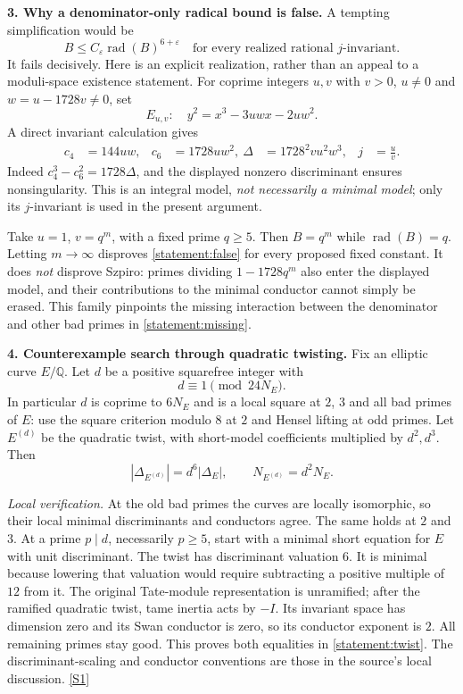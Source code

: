 \documentclass[11pt,a4paper]{article}
\newcommand{\Q}{\mathbb{Q}}
\newcommand{\sref}[2]{\hyperlink{source:#1:#2}{[S#2]}}
\numberwithin{equation}{section}
\begin{document}
\medskip
\textbf{3. Why a denominator-only radical bound is false.}
A tempting simplification would be
\begin{equation}\label{statement:false}
 B\leq C_\varepsilon\operatorname{rad}(B)^{6+\varepsilon}
 \quad\text{for every realized rational $j$-invariant.}
\end{equation}
It fails decisively. Here is an explicit realization, rather than an appeal
to a moduli-space existence statement. For coprime integers $u,v$ with
$v>0$, $u\neq0$ and $w=u-1728v\neq0$, set
\[
 E_{u,v}:\quad y^2=x^3-3uwx-2uw^2.
\]
A direct invariant calculation gives
\begin{align}
 c_4&=144uw, &c_6&=1728uw^2,\
 \Delta&=1728^2vu^2w^3, &j&=\frac uv. \label{statement:jmodel}
\end{align}
Indeed $c_4^3-c_6^2=1728\Delta$, and the displayed nonzero discriminant
ensures nonsingularity. This is an integral model, \emph{not necessarily a
minimal model}; only its $j$-invariant is used in the present argument.

Take $u=1$, $v=q^m$, with a fixed prime $q\geq5$. Then
$B=q^m$ while $\operatorname{rad}(B)=q$. Letting $m\to\infty$ disproves
\eqref{statement:false} for every proposed fixed constant. It does \emph{not}
disprove Szpiro: primes dividing $1-1728q^m$ also enter the displayed model,
and their contributions to the minimal conductor cannot simply be erased.
This family pinpoints the missing interaction between the denominator and
other bad primes in \eqref{statement:missing}.

\medskip
\textbf{4. Counterexample search through quadratic twisting.}
Fix an elliptic curve $E/\Q$. Let $d$ be a positive squarefree integer with
\[
 d\equiv1\pmod{24N_E}.
\]
In particular $d$ is coprime to $6N_E$ and is a local square at $2$, $3$ and
all bad primes of $E$: use the square criterion modulo $8$ at $2$ and Hensel
lifting at odd primes. Let $E^{(d)}$ be the quadratic twist, with short-model
coefficients multiplied by $d^2,d^3$. Then
\begin{equation}\label{statement:twist}
 |\Delta_{E^{(d)}}|=d^6|\Delta_E|,
 \qquad N_{E^{(d)}}=d^2N_E.
\end{equation}

\emph{Local verification.} At the old bad primes the curves are locally
isomorphic, so their local minimal discriminants and conductors agree.
The same holds at $2$ and $3$. At a prime $p\mid d$, necessarily $p\geq5$,
start with a minimal short equation for $E$ with unit discriminant. The twist
has discriminant valuation $6$. It is minimal because lowering that valuation
would require subtracting a positive multiple of $12$ from it. The original
Tate-module representation is unramified; after the ramified quadratic twist,
tame inertia acts by $-I$. Its invariant space has dimension zero and its
Swan conductor is zero, so its conductor exponent is $2$. All remaining
primes stay good. This proves both equalities in \eqref{statement:twist}.
The discriminant-scaling and conductor conventions are those in the
source's local discussion. \sref{statement}{1}
\end{document}
